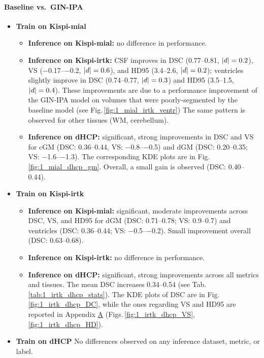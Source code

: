 \paragraph{Baseline vs.\ GIN-IPA}
\begin{itemize}
  \item \textbf{Train on Kispi-mial}
  \begin{itemize}
    \item \textbf{Inference on Kispi-mial:} no difference in performance.
    \item \textbf{Inference on Kispi-irtk:} CSF improves in DSC (\numrange[range-open-phrase=from\ ]{0.77}{0.81}, $\lvert d\rvert=0.2$), VS (\numrange[range-open-phrase=from\ ]{-0.17}{-0.2}, $\lvert d\rvert=0.6$), and HD95 (\numrange[range-open-phrase=from\ ]{3.4}{2.6}, $\lvert d\rvert=0.2$); ventricles slightly improve in DSC (\numrange[range-open-phrase=from\ ]{0.74}{0.77}, $\lvert d\rvert=0.3$) and HD95 (\numrange[range-open-phrase=from\ ]{3.5}{1.5}, $\lvert d\rvert=0.4$). These improvements are due to a performance improvement of the GIN-IPA model on volumes that were poorly-segmented by the baseline model (see Fig.\,\ref{fig:1_mial_irtk_ventr}) The same pattern is observed for other tissues (WM, cerebellum).
    \item \textbf{Inference on dHCP:} significant, strong improvements in DSC and VS for cGM (DSC: \numrange[range-open-phrase=from\ ]{0.36}{0.44}, VS: \numrange[range-open-phrase=from\ ]{-0.8}{-0.5}) and dGM (DSC: \numrange[range-open-phrase=from\ ]{0.20}{0.35}; VS: \numrange[range-open-phrase=from\ ]{-1.6}{-1.3}). The corresponding KDE plots are in Fig.\,\ref{fig:1_mial_dhcp_gm}. Overall, a small gain is observed (DSC: \numrange[range-open-phrase=from\ ]{0.40}{0.44}).
  \end{itemize}
  \item \textbf{Train on Kispi-irtk}
  \begin{itemize}
    \item \textbf{Inference on Kispi-mial:} significant, moderate improvements across DSC, VS, and HD95 for dGM (DSC: \numrange[range-open-phrase=from\ ]{0.71}{0.78}; VS: \numrange[range-open-phrase=from\ ]{0.9}{0.7}) and ventricles (DSC: \numrange[range-open-phrase=from\ ]{0.36}{0.44}; VS: \numrange[range-open-phrase=from\ ]{-0.5}{-0.2}). Small improvement overall (DSC: \numrange[range-open-phrase=from\ ]{0.63}{0.68}).
    \item \textbf{Inference on Kispi-irtk:} no difference in performance.
    \item \textbf{Inference on dHCP:} significant, strong improvements across all metrics and tissues. The mean DSC increases \numrange[range-open-phrase=from\ ]{0.34}{0.54} (see Tab.\,\ref{tab:1_irtk_dhcp_stats}). The KDE plots of DSC are in Fig.\,\ref{fig:1_irtk_dhcp_DC}, while the ones regarding VS and HD95 are reported in Appendix \hyperref[app:SupplementaryPlots]{A} (Figs.\,\ref{fig:1_irtk_dhcp_VS}, \ref{fig:1_irtk_dhcp_HD}).
  \end{itemize}
  \item \textbf{Train on dHCP}
  No differences observed on any inference dataset, metric, or label.
\end{itemize}

